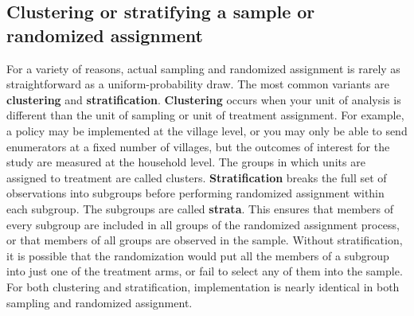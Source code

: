 
\subsection{Clustering or stratifying a sample or randomized assignment}

For a variety of reasons, actual sampling and randomized assignment
is rarely as straightforward as a uniform-probability draw.
The most common variants are \textbf{clustering} and \textbf{stratification}.\cite{athey2017econometrics}
\textbf{Clustering} occurs when your unit of analysis is different
than the unit of sampling or unit of treatment assignment.
For example, a policy may be implemented at the village level,
or you may only be able to send enumerators at a fixed number of villages,
but the outcomes of interest for the study are measured at the household level.
The groups in which units are assigned to treatment are called clusters.
\textbf{Stratification} breaks the full set of observations into subgroups
before performing randomized assignment within each subgroup.
The subgroups are called \textbf{strata}.
This ensures that members of every subgroup
are included in all groups of the randomized assignment process,
or that members of all groups are observed in the sample.
Without stratification, it is possible that the randomization
would put all the members of a subgroup into just one of the treatment arms,
or fail to select any of them into the sample.
For both clustering and stratification,
implementation is nearly identical in both sampling and randomized assignment.

